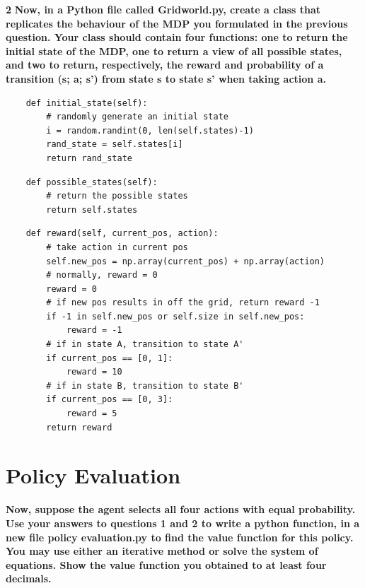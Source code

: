\documentclass[11pt]{article}
\begin{document}
\newpage
\noindent
\textbf{2}
\noindent
\textbf{Now, in a Python file called Gridworld.py, create a class that replicates
the behaviour of the MDP you formulated in the previous question. Your class
should contain four functions: one to return the initial state of the MDP, one to
return a view of all possible states, and two to return, respectively, the reward and
probability of a transition (s; a; s') from state s to state s' when taking action a.}
\\

\lstset{language=Python}
\lstset{frame=lines}
\lstset{basicstyle=\footnotesize}
\begin{lstlisting}
    def initial_state(self):
        # randomly generate an initial state
        i = random.randint(0, len(self.states)-1)
        rand_state = self.states[i]
        return rand_state
\end{lstlisting}

\lstset{basicstyle=\footnotesize}
\begin{lstlisting}
    def possible_states(self):
        # return the possible states
        return self.states
\end{lstlisting}

\lstset{basicstyle=\footnotesize}
\begin{lstlisting}
    def reward(self, current_pos, action):
        # take action in current pos
        self.new_pos = np.array(current_pos) + np.array(action)
        # normally, reward = 0
        reward = 0
        # if new pos results in off the grid, return reward -1
        if -1 in self.new_pos or self.size in self.new_pos:
            reward = -1
        # if in state A, transition to state A'
        if current_pos == [0, 1]:
            reward = 10
        # if in state B, transition to state B'
        if current_pos == [0, 3]:
            reward = 5
        return reward
\end{lstlisting}


\section{Policy Evaluation}
\textbf{Now, suppose the agent selects all four actions with equal probability. Use your
answers to questions 1 and 2 to write a python function, in a new file policy
evaluation.py to find the value function for this policy. You may use either an
iterative method or solve the system of equations. Show the value function you
obtained to at least four decimals.}
\\
\end{document}
